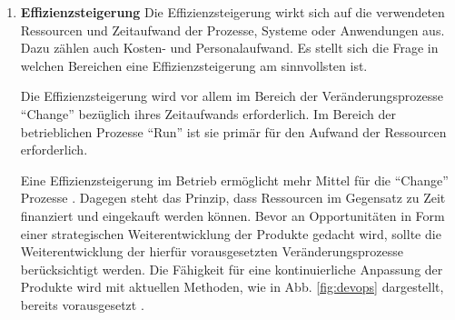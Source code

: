 \begin{enumerate}
    \item \textbf{Effizienzsteigerung}
    Die Effizienzsteigerung wirkt sich auf die verwendeten Ressourcen und Zeitaufwand der Prozesse, Systeme oder Anwendungen aus. Dazu zählen auch Kosten- und Personalaufwand. Es stellt sich die Frage in welchen Bereichen eine Effizienzsteigerung am sinnvollsten ist.
    
    Die Effizienzsteigerung wird vor allem im Bereich der Veränderungsprozesse \enquote{Change} bezüglich ihres Zeitaufwands erforderlich. Im Bereich der betrieblichen Prozesse \enquote{Run} ist sie primär für den Aufwand der Ressourcen erforderlich.
    
    Eine Effizienzsteigerung im Betrieb ermöglicht mehr Mittel für die \enquote{Change} Prozesse \cite{Rausch2006}. Dagegen steht das Prinzip, dass Ressourcen im Gegensatz zu Zeit finanziert und eingekauft werden können. Bevor an Opportunitäten in Form einer strategischen Weiterentwicklung der Produkte \cite{Rausch2006} gedacht wird, sollte die Weiterentwicklung der hierfür vorausgesetzten Veränderungsprozesse berücksichtigt werden. Die Fähigkeit für eine kontinuierliche Anpassung \cite{Bussmann2006, Ganswindt2006} der Produkte wird mit aktuellen Methoden, wie in Abb. \ref{fig:devops} dargestellt, bereits vorausgesetzt \cite{Alt2017}.

\end{enumerate}